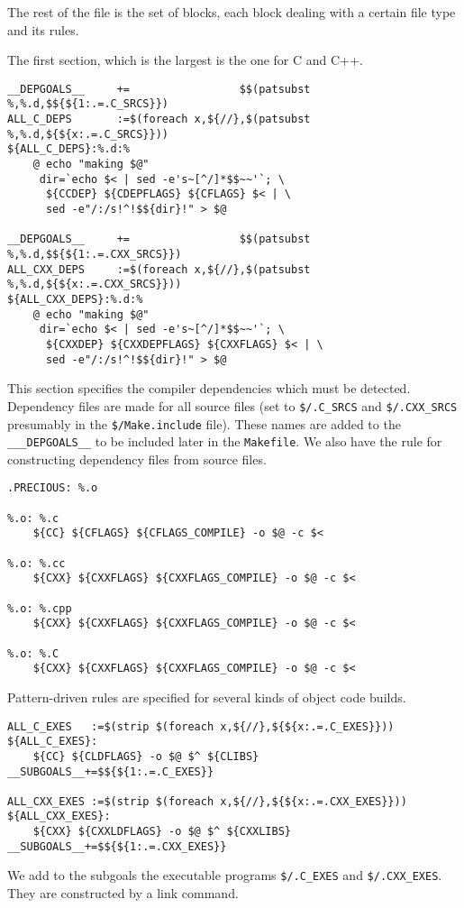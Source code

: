 \documentclass[letterpaper]{article}
\begin{document}
The rest of the file is the set of blocks, each block dealing with
a certain file type and its rules.

The first section, which is the largest is the one for C and C++.
\begin{verbatim}
__DEPGOALS__     +=                 $$(patsubst %,%.d,$${${1:.=.C_SRCS}})
ALL_C_DEPS       :=$(foreach x,${//},$(patsubst %,%.d,${${x:.=.C_SRCS}}))
${ALL_C_DEPS}:%.d:%
	@ echo "making $@"
	 dir=`echo $< | sed -e's~[^/]*$$~~'`; \
	  ${CCDEP} ${CDEPFLAGS} ${CFLAGS} $< | \
	  sed -e"/:/s!^!$${dir}!" > $@

__DEPGOALS__     +=                 $$(patsubst %,%.d,$${${1:.=.CXX_SRCS}})
ALL_CXX_DEPS     :=$(foreach x,${//},$(patsubst %,%.d,${${x:.=.CXX_SRCS}}))
${ALL_CXX_DEPS}:%.d:%
	@ echo "making $@"
	 dir=`echo $< | sed -e's~[^/]*$$~~'`; \
	  ${CXXDEP} ${CXXDEPFLAGS} ${CXXFLAGS} $< | \
	  sed -e"/:/s!^!$${dir}!" > $@
\end{verbatim}
This section specifies the compiler dependencies which must be
detected.  Dependency files are made for all source files
(set to \verb+$/.C_SRCS+ and \verb+$/.CXX_SRCS+ presumably in
the \verb+$/Make.include+ file).  These
names are added to the \verb+___DEPGOALS__+ to be included later
in the \verb+Makefile+.  We also have the rule for constructing
dependency files from source files.

\begin{verbatim}
.PRECIOUS: %.o

%.o: %.c
	${CC} ${CFLAGS} ${CFLAGS_COMPILE} -o $@ -c $<

%.o: %.cc
	${CXX} ${CXXFLAGS} ${CXXFLAGS_COMPILE} -o $@ -c $<

%.o: %.cpp
	${CXX} ${CXXFLAGS} ${CXXFLAGS_COMPILE} -o $@ -c $<

%.o: %.C
	${CXX} ${CXXFLAGS} ${CXXFLAGS_COMPILE} -o $@ -c $<
\end{verbatim}
Pattern-driven rules are specified for several kinds of
object code builds.

\begin{verbatim}
ALL_C_EXES   :=$(strip $(foreach x,${//},${${x:.=.C_EXES}}))
${ALL_C_EXES}:
	${CC} ${CLDFLAGS} -o $@ $^ ${CLIBS}
__SUBGOALS__+=$${${1:.=.C_EXES}}

ALL_CXX_EXES :=$(strip $(foreach x,${//},${${x:.=.CXX_EXES}}))
${ALL_CXX_EXES}:
	${CXX} ${CXXLDFLAGS} -o $@ $^ ${CXXLIBS}
__SUBGOALS__+=$${${1:.=.CXX_EXES}}
\end{verbatim}
We add to the subgoals the executable programs \verb+$/.C_EXES+ and
\verb+$/.CXX_EXES+.  They are constructed by a link command.
\end{document}
